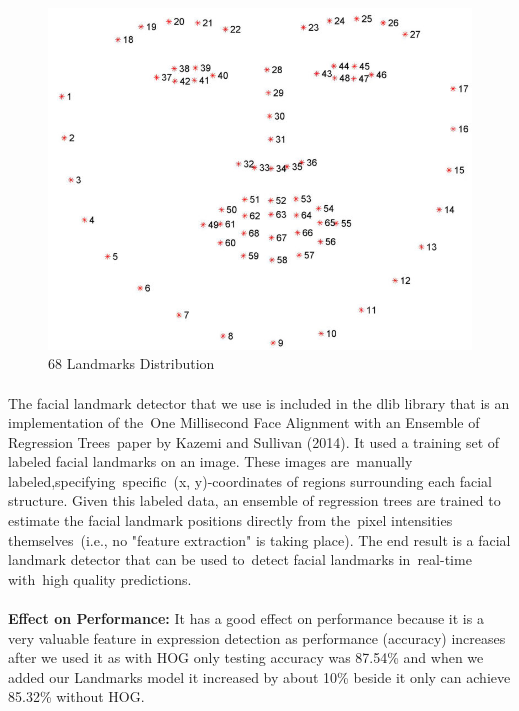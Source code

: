 \begin{figure}[H]
	\centering
	\includegraphics[width=\linewidth]{images/lm2.jpg}
	\caption{68 Landmarks Distribution}
\end{figure}

\paragraph{}
The facial landmark detector that we use is included in the dlib library that is an implementation of the One Millisecond Face Alignment with an Ensemble of Regression Trees paper by Kazemi and Sullivan (2014).\newline
It used a training set of labeled facial landmarks on an image. These images are manually labeled,specifying specific (x, y)-coordinates of regions surrounding each facial structure.\newline
Given this labeled data, an ensemble of regression trees are trained to estimate the facial landmark positions directly from the pixel intensities themselves (i.e., no "feature extraction" is taking place).\newline
The end result is a facial landmark detector that can be used to detect facial landmarks in real-time with high quality predictions.

\paragraph{}
\textbf{Effect on Performance:}\newline
It has a good effect on performance because it is a very valuable feature in expression detection as performance (accuracy) increases after we used it as with HOG only testing accuracy was 87.54\% and when we added our Landmarks model it increased by about 10\% beside it only can achieve 85.32\% without HOG.
